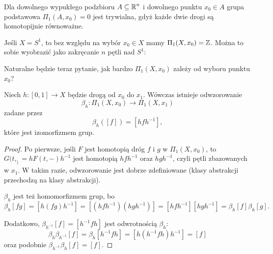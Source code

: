 \begin{example}
  \item Dla dowolnego wypukłego podzbioru $A\subseteq\operatorname{\mathbb{R}}^n$ i dowolnego punktu $x_0\in A$ grupa podstawowa $\Pi_1(A, x_0)=0$ jest trywialna, gdyż każde dwie drogi są homotopijnie równoważne.
  \item Jeśli $X=S^1$, to bez względu na wybór $x_0\in X$ mamy $\Pi_1(X, x_0)=\operatorname{\mathbb{Z}}$. Można to sobie wyobrazić jako zakręcanie $n$ pętli nad $S^1$:
    \begin{center}
    \end{center}
\end{example}

Naturalne będzie teraz pytanie, jak bardzo $\Pi_1(X, x_0)$ zależy od wyboru punktu $x_0$? 

\begin{lemma}\label{lemma:1.5}
  Niech $h:[0,1]\to X$ będzie drogą od $x_0$ do $x_1$. Wówczas istnieje odwzorowanie 
  $$\beta_h:\Pi_1(X, x_0)\to \Pi_1(X, x_1)$$
  zadane przez 
  $$\beta_h([f])=[hfh^{-1}],$$
  które jest izomorfizmem grup.
\end{lemma}

\begin{proof}
  Po pierwsze, jeśli $F$ jest homotopią dróg $f$ i $g$ w $\Pi_1(X, x_0)$, to $G(t, _)=hF(t,-)h^{-1}$ jest homotopią $hfh^{-1}$ oraz $hgh^{-1}$, czyli pętli zbazowanych w $x_1$. W takim razie, odwzorowanie jest dobrze zdefiniowane (klasy abstrakcji przechodzą na klasy abstrakcji).

  $\beta_h$ jest też homomorfizmem grup, bo 
  $$\beta_h[fg]=[h(fg)h^{-1}]=[(hfh^{-1})(hgh^{-1})]=[hfh^{-1}][hgh^{-1}]=\beta_h[f]\beta_h[g].$$
  
  Dodatkowo, $\beta_{h^{-1}}[f]=[h^{-1}fh]$ jest odwrotnością $\beta_h$:
  $$\beta_h\beta_{h^{-1}}[f]=\beta_h[h^{-1}fh]=[h(h^{-1}fh)h^{-1}]=[f]$$
  oraz podobnie $\beta_{h^{-1}}\beta_h[f]=[f]$.
\end{proof}

